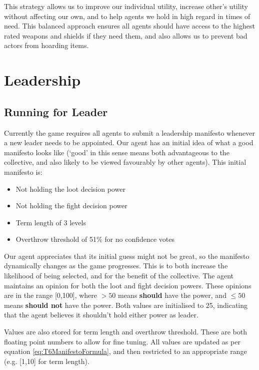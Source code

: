 This strategy allows us to improve our individual utility, increase other's utility without affecting our own, and to help agents we hold in high regard in times of need. This balanced approach ensures all agents should have access to the highest rated weapons and shields if they need them, and also allows us to prevent bad actors from hoarding items.

\section{Leadership}

\subsection{Running for Leader}\label{T6RunningForLeader}

Currently the game requires all agents to submit a leadership manifesto whenever a new leader needs to be appointed. Our agent has an initial idea of what a good manifesto looks like (`good' in this sense means both advantageous to the collective, and also likely to be viewed favourably by other agents). This initial manifesto is:

\begin{itemize}
    \item Not holding the loot decision power
    \item Not holding the fight decision power
    \item Term length of 3 levels
    \item Overthrow threshold of 51\% for no confidence votes
\end{itemize}

Our agent appreciates that its initial guess might not be great, so the manifesto dynamically changes as the game progresses. This is to both increase the likelihood of being selected, and for the benefit of the collective. The agent maintains an opinion for both the loot and fight decision powers. These opinions are in the range [0,100], where $>50$ means \textbf{should} have the power, and $\leq 50$ means \textbf{should not} have the power. Both values are initialised to 25, indicating that the agent believes it shouldn't hold either power as leader.

Values are also stored for term length and overthrow threshold. These are both floating point numbers to allow for fine tuning. All values are updated as per equation \ref{eq:T6ManifestoFormula}, and then restricted to an appropriate range (e.g. [1,10] for term length).

